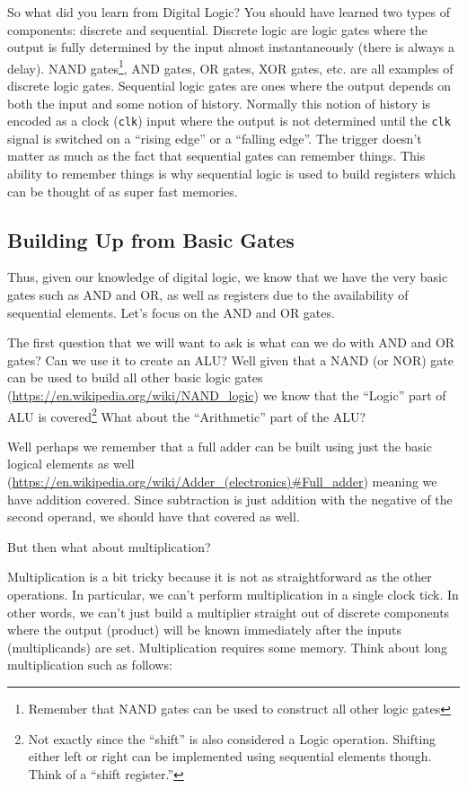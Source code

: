 So what did you learn from Digital Logic? You should have learned two types of components: discrete and sequential. Discrete logic are logic gates where the output is fully determined by the input almost instantaneously (there is always a delay). NAND gates\footnote{Remember that NAND gates can be used to construct all other logic gates}, AND gates, OR gates, XOR gates, etc. are all examples of discrete logic gates. Sequential logic gates are ones where the output depends on both the input and some notion of history. Normally this notion of history is encoded as a clock ({\tt clk}) input where the output is not determined until the {\tt clk} signal is switched on a ``rising edge'' or a ``falling edge''. The trigger doesn’t matter as much as the fact that sequential gates can remember things. This ability to remember things is why sequential logic is used to build registers which can be thought of as super fast memories.

\subsection{Building Up from Basic Gates}

Thus, given our knowledge of digital logic, we know that we have the very basic gates such as AND and OR, as well as registers due to the availability of sequential elements. Let’s focus on the AND and OR gates. 

The first question that we will want to ask is what can we do with AND and OR gates? Can we use it to create an ALU? Well given that a NAND (or NOR) gate can be used to build all other basic logic gates (\url{https://en.wikipedia.org/wiki/NAND_logic}) we know that the ``Logic'' part of ALU is covered\footnote{Not exactly since the ``shift'' is also considered a Logic operation. Shifting either left or right can be implemented using sequential elements though. Think of a ``shift register.''}  What about the ``Arithmetic'' part of the ALU? 

Well perhaps we remember that a full adder can be built using just the basic logical elements as well (\url{https://en.wikipedia.org/wiki/Adder_(electronics)#Full_adder}) meaning we have addition covered. Since subtraction is just addition with the negative of the second operand, we should have that covered as well.

But then what about multiplication?

Multiplication is a bit tricky because it is not as straightforward as the other operations. In particular, we can’t perform multiplication in a single clock tick. In other words, we can’t just build a multiplier straight out of discrete components where the output (product) will be known immediately after the inputs (multiplicands) are set. Multiplication requires some memory. Think about long multiplication such as follows:

